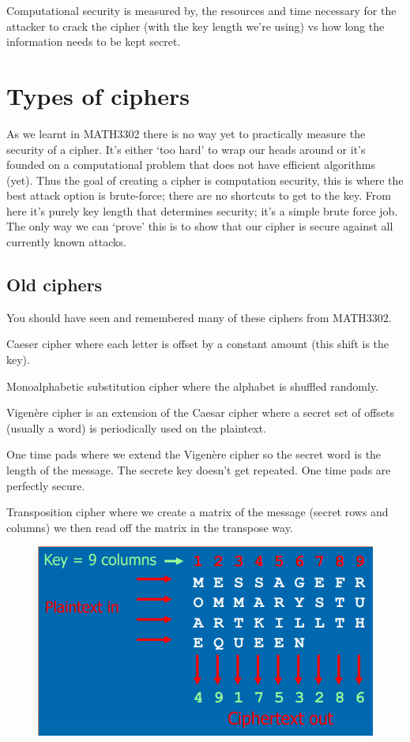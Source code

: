 \documentclass{report}
\begin{document}
Computational security is measured by, the resources and time necessary for the
attacker to crack the cipher (with the key length we're using)
vs how long the information needs to be kept
secret.

\chapter{Types of ciphers}
As we learnt in MATH3302 there is no way yet to practically measure the security
of a cipher. It's either `too hard' to wrap our heads around or it's founded on
a computational problem that does not have efficient algorithms (yet).
Thus the goal of creating a cipher is computation security,
this is where the best
attack option is brute-force; there are no shortcuts to get to the key.
From here it's purely key length that determines security; it's a simple brute
force job.
The only way we can `prove' this is to show that our cipher is secure against
all currently known attacks.

\section{Old ciphers}
You should have seen and remembered many of these ciphers from MATH3302.

Caeser cipher where each letter is offset by a constant amount (this shift is
the key).

Monoalphabetic substitution cipher where the alphabet is shuffled randomly.

Vigenère cipher is an extension of the Caesar cipher where a secret set of
offsets (usually a word) is periodically used on the plaintext.

One time pads where we extend the Vigenère cipher so the secret word is the
length of the message. The secrete key doesn't get repeated. One time pads
are perfectly secure.

Transposition cipher where we create a matrix of the message (secret rows and
columns) we then read off the matrix in the transpose way.
\begin{figure}[h]
    \centering
    \includegraphics[width=\textwidth]{images/transpositioncipher.png}
\end{figure}
\end{document}

